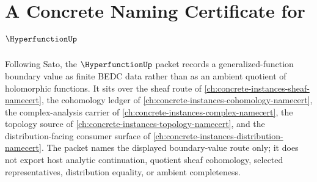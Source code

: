 \chapter{A Concrete Naming Certificate for $\HyperfunctionUp$}
\label{ch:concrete-instances-hyperfunction-namecert}

Following Sato, the $\HyperfunctionUp$ packet records a generalized-function boundary value as finite BEDC data rather than as an ambient quotient of holomorphic functions. It sits over the sheaf route of \autoref{ch:concrete-instances-sheaf-namecert}, the cohomology ledger of \autoref{ch:concrete-instances-cohomology-namecert}, the complex-analysis carrier of \autoref{ch:concrete-instances-complex-namecert}, the topology source of \autoref{ch:concrete-instances-topology-namecert}, and the distribution-facing consumer surface of \autoref{ch:concrete-instances-distribution-namecert}. The packet names the displayed boundary-value route only; it does not export host analytic continuation, quotient sheaf cohomology, selected representatives, distribution equality, or ambient completeness.

